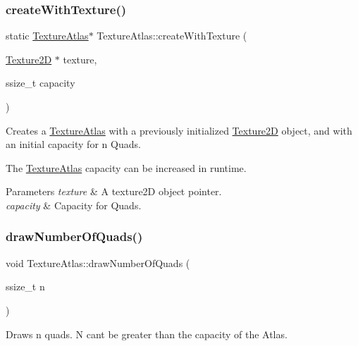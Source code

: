\subsubsection{\texorpdfstring{create\+With\+Texture()}{createWithTexture()}\hspace{0.1cm}{\footnotesize\ttfamily [2/2]}}
{\footnotesize\ttfamily static \hyperlink{classTextureAtlas}{Texture\+Atlas}$\ast$ Texture\+Atlas\+::create\+With\+Texture (\begin{DoxyParamCaption}\item[{\hyperlink{classTexture2D}{Texture2D} $\ast$}]{texture,  }\item[{ssize\+\_\+t}]{capacity }\end{DoxyParamCaption})\hspace{0.3cm}{\ttfamily [static]}}

Creates a \hyperlink{classTextureAtlas}{Texture\+Atlas} with a previously initialized \hyperlink{classTexture2D}{Texture2D} object, and with an initial capacity for n Quads.

The \hyperlink{classTextureAtlas}{Texture\+Atlas} capacity can be increased in runtime. 
\begin{DoxyParams}{Parameters}
{\em texture} & A texture2D object pointer. \\
\hline
{\em capacity} & Capacity for Quads. \\
\hline
\end{DoxyParams}
\mbox{\label{classTextureAtlas_af240674591a46ea07ab218b702767c5b}} 
\subsubsection{\texorpdfstring{draw\+Number\+Of\+Quads()}{drawNumberOfQuads()}\hspace{0.1cm}{\footnotesize\ttfamily [1/4]}}
{\footnotesize\ttfamily void Texture\+Atlas\+::draw\+Number\+Of\+Quads (\begin{DoxyParamCaption}\item[{ssize\+\_\+t}]{n }\end{DoxyParamCaption})}

Draws n quads. N can\textquotesingle{}t be greater than the capacity of the Atlas. \mbox{\label{classTextureAtlas_af240674591a46ea07ab218b702767c5b}} 
